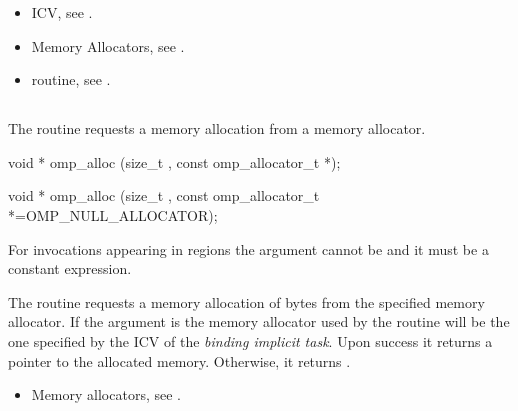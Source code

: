\crossreferences
\begin{itemize}
\item {} ICV, see .
\item Memory Allocators, see .
\item {} routine, see .
\end{itemize}

\ccppspecificstart

\subsection{}
\label{subsec:omp_alloc}

\summary
The  routine requests a memory allocation from a memory allocator.

\format
\begin{cspecific}
\begin{boxedcode}
void * omp_alloc (size_t , const omp_allocator_t *);
\end{boxedcode}
\end{cspecific}
\begin{cppspecific}
\begin{boxedcode}
void * omp_alloc (size_t , 
           const omp_allocator_t *=OMP_NULL_ALLOCATOR);
\end{boxedcode}
\end{cppspecific}

\constraints

For  invocations appearing in  regions the  argument cannot be  and it must be a constant expression.

\effect

The  routine requests a memory allocation of  bytes from the specified memory allocator. If the  argument is 
 the memory allocator used by the routine will be the one specified by the  ICV of the \emph{binding implicit task}.
Upon success it returns a pointer to the allocated memory. Otherwise, it returns .

\crossreferences
\begin{itemize}
\item Memory allocators, see .
\end{itemize}

